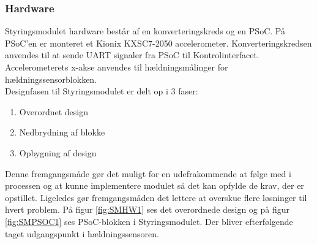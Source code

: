\subsubsection{Hardware}
Styringsmodulet hardware består af en konverteringskreds og en PSoC. På PSoC'en er monteret et Kionix KXSC7-2050 accelerometer. Konverteringskredsen anvendes til at sende UART signaler fra PSoC til Kontrolinterfacet. Accelerometerets x-akse anvendes til hældningsmålinger for hældningssensorblokken.\\
Designfasen til Styringsmodulet er delt op i 3 faser:
\begin{enumerate}
\item Overordnet design
\item Nedbrydning af blokke
\item Opbygning af design
\end{enumerate}
Denne fremgangsmåde gør det muligt for en udefrakommende at følge med i processen og at kunne implementere modulet så det kan opfylde de krav, der er opstillet. Ligeledes gør fremgangsmåden det lettere at overskue flere løsninger til hvert problem. På figur \ref{fig:SMHW1} ses det overordnede design og på figur \ref{fig:SMPSOC1} ses PSoC-blokken i Styringsmodulet. Der bliver efterfølgende taget udgangspunkt i hældningssensoren.\\
